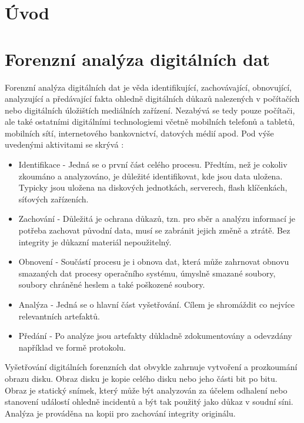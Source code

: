 

\chapter{Úvod}

\chapter{Forenzní analýza digitálních dat} %
Forenzní analýza digitálních dat je věda identifikující, zachovávající, obnovující, analyzující a předávající fakta ohledně digitálních důkazů nalezených v počítačích nebo digitálních úložištích mediálních zařízení.
Nezabývá se tedy pouze počítači, ale také ostatními digitálními technologiemi včetně mobilních telefonů a tabletů, mobilních sítí, internetového bankovnictví, datových médií apod. Pod výše uvedenými aktivitami se skrývá \cite{whatIsDigFor}:

\begin{itemize}
\item Identifikace - Jedná se o první část celého procesu. Předtím, než je cokoliv zkoumáno a analyzováno, je důležité identifikovat, kde jsou data uložena. Typicky jsou uložena na diskových jednotkách, serverech, flash klíčenkách, síťových zařízeních.

\item Zachování - Důležitá je ochrana důkazů, tzn. pro sběr a analýzu informací je potřeba zachovat původní data, musí se zabránit jejich změně a ztrátě. Bez integrity je důkazní materiál nepoužitelný.

\item Obnovení - Součástí procesu je i obnova dat, která může zahrnovat obnovu smazaných dat procesy operačního systému, úmyslně smazané soubory, soubory chráněné heslem a také poškozené soubory.

\item Analýza - Jedná se o hlavní část vyšetřování. Cílem je shromáždit co nejvíce relevantních artefaktů.

\item Předání - Po analýze jsou artefakty důkladně zdokumentovány a odevzdány například ve formě protokolu.
\end{itemize}

\noindent Vyšetřování digitálních forenzních dat obvykle zahrnuje vytvoření a prozkoumání obrazu disku. Obraz disku je kopie celého disku nebo jeho části bit po bitu. Obraz je statický snímek, který může být analyzován za účelem odhalení nebo stanovení událostí ohledně incidentů a být tak použitý jako důkaz v soudní síni. Analýza je prováděna na kopii pro zachování integrity originálu.

